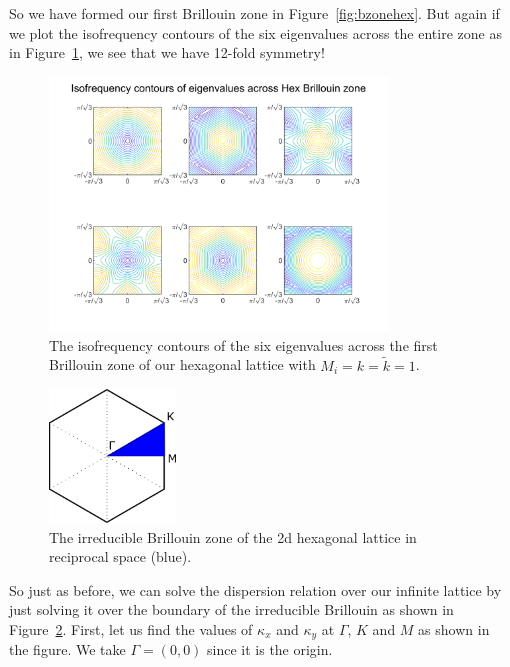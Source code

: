 So we have formed our first Brillouin zone in Figure~\ref{fig:bzonehex}. But
again if we plot the isofrequency contours of the six eigenvalues across the
entire zone as in Figure~\ref{fig:hexisofreq}, we see that we have 12-fold
symmetry!

\begin{figure}[!h]
\centering
\includegraphics[width=0.8\textwidth]{imgs/hexisofreq.png}
\caption{\label{fig:hexisofreq} The isofrequency contours of the six
  eigenvalues across the first Brillouin zone of our hexagonal lattice with
  $M_i=k=\tilde{k}=1$.}
\end{figure}

\begin{figure}[!h]
\centering
\includegraphics[width=0.3\textwidth]{imgs/hexibz.png}
\caption{\label{fig:ibzonehex} The irreducible Brillouin zone of the 2d
    hexagonal lattice in reciprocal space (blue).}
\end{figure}

So just as before, we can solve the dispersion relation over our infinite lattice
by just solving it over the boundary of the irreducible Brillouin as shown in
Figure~\ref{fig:ibzonehex}. First, let us find the values of $\kappa_{x}$ and
$\kappa_{y}$ at $\Gamma$, $K$ and $M$ as shown in the figure. We take
$\Gamma=(0,0)$ since it is the origin. 

